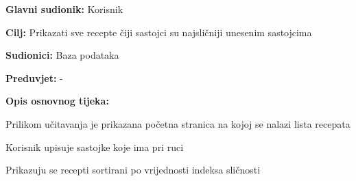 \noindent {}
\begin{packed_item}

	\item \textbf{Glavni sudionik: } Korisnik
	\item  \textbf{Cilj:} Prikazati sve recepte čiji sastojci su najsličniji unesenim sastojcima
	\item  \textbf{Sudionici:} Baza podataka
	\item  \textbf{Preduvjet:} -
	\item  \textbf{Opis osnovnog tijeka:}

	\item[] \begin{packed_enum}

		\item Prilikom učitavanja je prikazana početna stranica na kojoj se nalazi lista recepata
		\item Korisnik upisuje sastojke koje ima pri ruci
		\item Prikazuju se recepti sortirani po vrijednosti indeksa sličnosti

	\end{packed_enum}
\end{packed_item}

